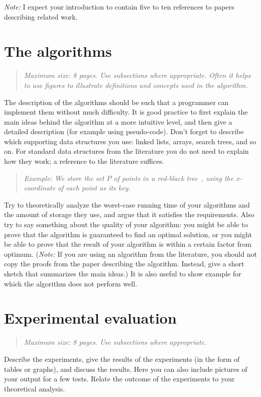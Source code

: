 \documentclass[11pt]{article}
\newcommand{\maxsize}[1]{\begin{quotation} {\sl \noindent Maximum size: #1.} \end{quotation}}
\newcommand{\example}[1]{\begin{quotation} {\sl \noindent Example: #1} \end{quotation}}
\begin{document}
					\emph{Note:} I expect your introduction to
					contain five to ten references to papers describing related work.

					\section{The algorithms}
					\label{se:algorithms}
					\maxsize{8 pages. Use subsections where appropriate. Often it helps to use figures
						to illustrate definitions and concepts used in the algorithm}
						The description of the algorithms should be such that a programmer can
						implement them without much difficulty. It is good practice to first explain the
						main ideas behind the algorithm at a more intuitive level, and then give a
						detailed description (for example using pseudo-code).
						Don't forget to describe which supporting data structures you use:
						linked lists, arrays, search trees, and so on. For standard data structures
						from the literature you do not need to explain how they work; a reference
						to the literature suffices.
						\example{We store the set $P$ of points in a red-black tree~\cite{clrs-ia-01},
							using the $x$-coordinate of each point as its key.}
							Try to theoretically analyze the worst-case running time of your algorithms
							and the amount of storage they use, and argue that it satisfies the requirements.
							Also try to say something about the quality of your algorithm: you might be able to prove that the algorithm is guaranteed to find an optimal solution, or
							you might be able to prove that the result of your algorithm is within a certain factor
							from optimum. (\emph{Note:} If you are using an algorithm from the literature, you should not
									copy the proofs from the paper describing the algorithm. Instead, give a short sketch that
									summarizes the main ideas.)
							It is also useful to show example for which the algorithm does not
							perform well.


							\section{Experimental evaluation}
							\label{se:evaluation}
							\maxsize{8 pages. Use subsections where appropriate}
							Describe the experiments, give the results of the experiments (in the form of tables or graphs),
							and discuss the results. Here you can also include pictures of your output for a few tests.
							Relate the outcome of the experiments to your theoretical analysis.
\end{document}
